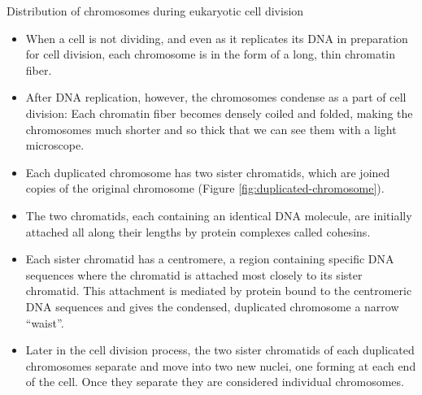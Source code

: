 \documentclass[11pt,ignorenonframetext,aspectratio=169]{beamer}
\providecommand{\tightlist}{%
  \setlength{\itemsep}{0pt}\setlength{\parskip}{0pt}}
\begin{document}
\begin{frame}{Distribution of chromosomes during eukaryotic cell
division}
\protect\hypertarget{distribution-of-chromosomes-during-eukaryotic-cell-division}{}
\begin{itemize}
\tightlist
\item
  When a cell is not dividing, and even as it replicates its DNA in
  preparation for cell division, each chromosome is in the form of a
  long, thin chromatin fiber.
\item
  After DNA replication, however, the chromosomes condense as a part of
  cell division: Each chromatin fiber becomes densely coiled and folded,
  making the chromosomes much shorter and so thick that we can see them
  with a light microscope.
\item
  Each duplicated chromosome has two sister chromatids, which are joined
  copies of the original chromosome (Figure
  \ref{fig:duplicated-chromosome}).
\item
  The two chromatids, each containing an identical DNA molecule, are
  initially attached all along their lengths by protein complexes called
  cohesins.
\end{itemize}
\end{frame}

\begin{frame}{}
\protect\hypertarget{section-5}{}
\begin{itemize}
\tightlist
\item
  Each sister chromatid has a centromere, a region containing specific
  DNA sequences where the chromatid is attached most closely to its
  sister chromatid. This attachment is mediated by protein bound to the
  centromeric DNA sequences and gives the condensed, duplicated
  chromosome a narrow ``waist''.
\item
  Later in the cell division process, the two sister chromatids of each
  duplicated chromosomes separate and move into two new nuclei, one
  forming at each end of the cell. Once they separate they are
  considered individual chromosomes.
\end{itemize}
\end{frame}
\end{document}

